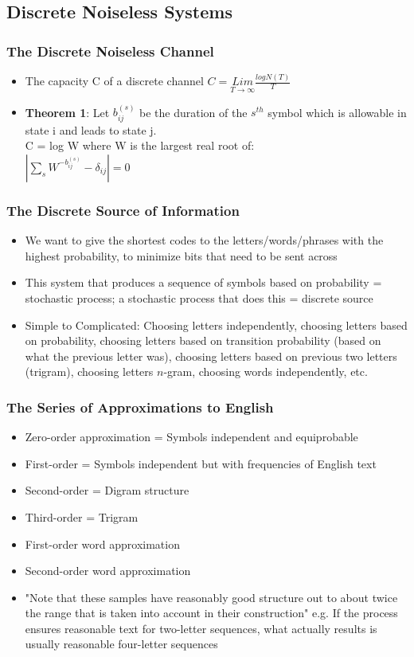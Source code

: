 \documentclass[leqno,twocolumn]{article}
\begin{document}
\subsection{Discrete Noiseless Systems}
\subsubsection{The Discrete Noiseless Channel}
\begin{itemize}
\item The capacity C of a discrete channel $C = \underset{T \rightarrow \infty}{Lim} \frac{logN(T)}{T}$
\item \textbf{Theorem 1}: Let $b^{(s)}_{ij}$ be the duration of the $s^{th}$ symbol which is allowable in state i and leads to state j.\\
C = log W where W is the largest real root of:\\
$|\sum_s W^{-b^{(s)}_{ij}} - \delta_{ij}| = 0$
\end{itemize}

\subsubsection{The Discrete Source of Information}
\begin{itemize}
\item We want to give the shortest codes to the letters/words/phrases with the highest probability, to minimize bits that need to be sent across
\item This system that produces a sequence of symbols based on probability = stochastic process; a stochastic process that does this = discrete source
\item Simple to Complicated: Choosing letters independently, choosing letters based on probability, choosing letters based on transition probability (based on what the previous letter was), choosing letters based on previous two letters (trigram), choosing letters $n$-gram, choosing words independently, etc.
\end{itemize}

\subsubsection{The Series of Approximations to English}
\begin{itemize}
\item Zero-order approximation = Symbols independent and equiprobable
\item First-order = Symbols independent but with frequencies of English text
\item Second-order = Digram structure
\item Third-order = Trigram
\item First-order word approximation
\item Second-order word approximation
\item "Note that these samples have reasonably good structure out to about twice the range that is taken into account in their construction" e.g. If the process ensures reasonable text for two-letter sequences, what actually results is usually reasonable four-letter sequences
\end{itemize}
\end{document}

